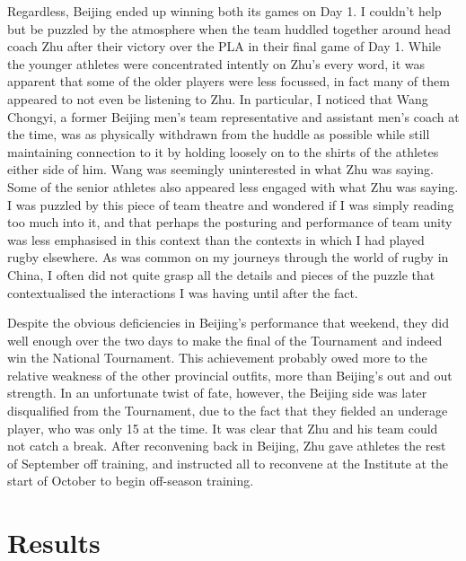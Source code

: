 \begin{CJK}{UTF8}{gbsn}
  Regardless, Beijing ended up winning both its games on Day 1. I couldn't help but be puzzled by the atmosphere when the team huddled together around head coach Zhu after their victory over the PLA in their final game of Day 1.  While the younger athletes were concentrated intently on Zhu's every word, it was apparent that some of the older players were less focussed, in fact many of them appeared to not even be listening to Zhu.  In particular, I noticed that Wang Chongyi, a former Beijing men's team representative and assistant men's coach at the time, was as physically withdrawn from the huddle as possible while still maintaining connection to it by holding loosely on to the shirts of the athletes either side of him. Wang was seemingly uninterested in what Zhu was saying.  Some of the senior athletes also appeared less engaged with what Zhu was saying.  I was puzzled by this piece of team theatre and wondered if I was simply reading too much into it, and that perhaps the posturing and performance of team unity was less emphasised in this context than the contexts in which I had played rugby elsewhere. As was common on my journeys through the world of rugby in China, I often did not quite grasp all the details and pieces of the puzzle that contextualised the interactions I was having until after the fact.

  Despite the obvious deficiencies in Beijing's performance that weekend, they did well enough over the two days to make the final of the Tournament and indeed win the National Tournament.  This achievement probably owed more to the relative weakness of the other provincial outfits, more than Beijing's out and out strength.  In an unfortunate twist of fate, however, the Beijing side was later disqualified from the Tournament, due to the fact that they fielded an underage player, who was only 15 at the time.  It was clear that Zhu and his team could not catch a break.  After reconvening back in Beijing, Zhu gave athletes the rest of September off training, and instructed all to reconvene at the Institute at the start of October to begin off-season training.


















  \section{Results}


\end{CJK}
